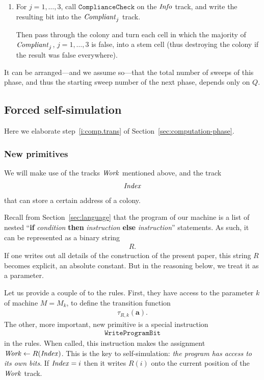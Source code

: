 \documentclass[11pt]{memoir}
\theoremstyle{definition} %
\renewcommand{\vek}[1]{\mathbf{#1}}
\newcommand{\fld}[1]{\ensuremath{\textit{#1\/}}}
\newcommand{\rul}[1]{\ensuremath{\texttt{#1}}}
\newcommand{\va}{\vek{a}}
\newcommand{\Q}{Q}
\newcommand{\Index}{\fld{Index}}
\newcommand{\Info}{\fld{Info}}
\newcommand{\Work}{\fld{Work}}
\newcommand{\WriteProgramBit}{\rul{WriteProgramBit}}
\begin{document}
\begin{enumerate}
       \item       For \( j=1,\dots,3 \), call \( \rul{ComplianceCheck} \) on the \( \Info \) track, and
write the resulting bit into the \( \fld{Compliant}_{j} \) track.

Then pass through the colony and turn each cell in which the majority 
of \( \fld{Compliant}_{j} \), \( j=1,\dots,3 \) is false,
into a stem cell (thus destroying the colony if the result was false everywhere).

  \end{enumerate}

It can be arranged---and we assume so---that the total number of sweeps of this
phase, and thus the starting sweep number of the next phase, depends only on \( \Q \).

\subsection{Forced self-simulation}\label{sec:self-simulation}

Here we elaborate step~\ref{i:comp.trans} of Section~\ref{sec:computation-phase}.

\subsubsection{New primitives}

We will make use of the tracks \( \Work \) mentioned above, and the track
\begin{align*}
   \Index
 \end{align*}
that can store a certain address of a colony.

Recall from Section~\ref{sec:language} that the program
of our machine is a list of nested
``\textbf{if} \emph{condition} \textbf{then} \emph{instruction}
\textbf{else} \emph{instruction}''
statements.
As such, it can be represented as a binary string 
 \begin{align*}
   R.
 \end{align*}
If one writes out all details of the construction of the present paper, this string \( R \)
becomes explicit, an absolute constant.
But in the reasoning below, we treat it as a parameter.

Let us provide a couple of  to the rules.
First, they have access to the parameter \( k \) of machine \( M=M_{k} \), 
to define the transition function
 \begin{align*}
            \tau_{R,k}(\va).
 \end{align*}
The other, more important, new primitive is a special instruction
 \begin{align*}
   \WriteProgramBit
 \end{align*}
in the rules.
When called, this instruction makes the assignment \( \Work\gets R(\Index) \).
This is the key to self-simulation: \emph{the program has
access to its own bits}.
If \( \Index=i \) then it writes \( R(i) \) onto the current position of the \( \Work \) track.
\end{document}
